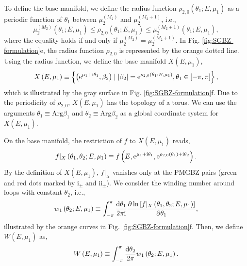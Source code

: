\documentclass[pdflatex,sn-nature, iicol]{sn-jnl}%
\theoremstyle{thmstyleone}%
\theoremstyle{thmstyletwo}%
\theoremstyle{thmstylethree}%
\begin{document}
To define the base manifold, we define
the radius function $\rho_{2,0}(\theta_{1};E,\mu_{1})$ as a periodic
function of $\theta_{1}$ between $\mu_{2}^{(M_{2})}$ and $\mu_{2}^{(M_{2}+1)}$,
i.e., 
\begin{equation}
\mu_{2}^{(M_{2})}\left(\theta_{1};E,\mu_{1}\right)\leq \rho_{2,0}\left(\theta_{1};E,\mu_{1}\right)\leq\mu_{2}^{(M_{2}+1)}\left(\theta_{1};E,\mu_{1}\right),\label{eq:radius-function}
\end{equation}
where the equality holds if and only if $\mu_{2}^{(M_{2})}=\mu_{2}^{(M_{2}+1)}$.
In Fig. \ref{fig:SGBZ-formulation}e, the radius function  $\rho_{2,0}$ 
is represented by the orange dotted line. Using the radius function, we define the base manifold $X(E,\mu_{1})$, 
\begin{equation}
X\left(E,\mu_{1}\right)\equiv\left\{ \left(\mathrm{e}^{\mu_{1}+\mathrm{i}\theta_{1}},\beta_{2}\right)\mid\left|\beta_{2}\right|=\mathrm{e}^{\rho_{2,0}\left(\theta_{1};E,\mu_{1}\right)},\theta_{1}\in\left[-\pi,\pi\right]\right\} ,\label{eq:base-manifold}
\end{equation}
which is illustrated by the gray surface in Fig. \ref{fig:SGBZ-formulation}f.
Due to the periodicity of $\rho_{2,0}$, $X(E,\mu_{1})$ has the topology
of a torus. We can use the arguments $\theta_{1}\equiv\text{Arg}\beta_{1}$
and $\theta_{2}\equiv\text{Arg}\beta_{2}$ as a global coordinate
system for $X(E,\mu_{1})$.

On the base manifold, the restriction of $f$ to $X(E,\mu_{1})$ reads,
\begin{equation}
f|_{X}\left(\theta_{1},\theta_{2};E,\mu_{1}\right)\equiv f\left(E,\mathrm{e}^{\mu_{1}+\mathrm{i}\theta_{1}},\mathrm{e}^{\rho_{2,0}(\theta_{1})+\mathrm{i}\theta_{2}}\right).
\end{equation}
By the definition of $X(E,\mu_{1})$, $f|_{X}$ vanishes only at the
PMGBZ pairs (green and red dots marked by $\text{i}_{\pm}$ and $\text{ii}_{\pm}$).
We consider the winding number around loops with constant $\theta_{2}$,
i.e., 
\begin{equation}
w_{1}\left(\theta_{2};E,\mu_{1}\right)\equiv\int_{-\pi}^{\pi}\frac{\mathrm{d}\theta_{1}}{2\pi\mathrm{i}}\frac{\partial\ln\left[f|_{X}\left(\theta_{1},\theta_{2};E,\mu_{1}\right)\right]}{\partial\theta_{1}},
\end{equation}
illustrated by the orange curves in Fig. \ref{fig:SGBZ-formulation}f.
Then, we define $W(E,\mu_1)$ as, 
\begin{equation}
W\left(E,\mu_{1}\right)\equiv\int_{-\pi}^{\pi}\frac{\mathrm{d}\theta_{2}}{2\pi}w_{1}\left(\theta_{2};E,\mu_{1}\right).\label{eq:def-strip-winding}
\end{equation}
\end{document}
